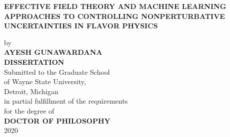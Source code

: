 \setcounter{page}{1} 
\thispagestyle{empty}
\begin{titlepage}

	\singlespacing
	\begin{center}

	\singlespacing
	\textbf{EFFECTIVE FIELD THEORY AND MACHINE LEARNING APPROACHES TO CONTROLLING NONPERTURBATIVE UNCERTAINTIES IN FLAVOR PHYSICS}\\
	\doublespacing

	by\\

	\textbf{AYESH GUNAWARDANA}\\

	\textbf{DISSERTATION}\\


	
	
	
	Submitted to the Graduate School\\

        of Wayne State University,\\
        Detroit, Michigan\\

	in partial fulfillment of the requirements\\

	for the degree of\\

	\textbf{DOCTOR OF PHILOSOPHY}\\

	2020
	\end{center}
	\vspace{-0.9cm}
	\begin{flushright}
	\doublespacing
	 \\
	 \\
	\vspace{0.7cm}
	 \\
    \vspace{0.4cm}
	\makebox[8.7cm][l]{$\overline {\hspace{7.8cm}}$} \\
   	\vspace{0.7cm}
	\makebox[8.7cm][l]{$\overline {\hspace{7.8cm}}$} \\
    \vspace{0.7cm}
	\makebox[8.7cm][l]{$\overline {\hspace{7.8cm}}$} \\
	
	\end{flushright}

	\end{titlepage}
